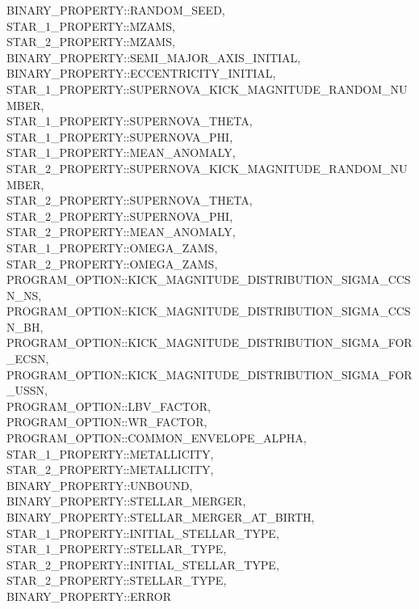 \hfill
\begin{minipage}{\dimexpr\textwidth-2em}
    BINARY\_PROPERTY::RANDOM\_SEED, \\
    STAR\_1\_PROPERTY::MZAMS, \\
    STAR\_2\_PROPERTY::MZAMS, \\
    BINARY\_PROPERTY::SEMI\_MAJOR\_AXIS\_INITIAL, \\
    BINARY\_PROPERTY::ECCENTRICITY\_INITIAL, \\
    STAR\_1\_PROPERTY::SUPERNOVA\_KICK\_MAGNITUDE\_RANDOM\_NUMBER, \\
    STAR\_1\_PROPERTY::SUPERNOVA\_THETA, \\
    STAR\_1\_PROPERTY::SUPERNOVA\_PHI, \\
    STAR\_1\_PROPERTY::MEAN\_ANOMALY, \\
    STAR\_2\_PROPERTY::SUPERNOVA\_KICK\_MAGNITUDE\_RANDOM\_NUMBER, \\
    STAR\_2\_PROPERTY::SUPERNOVA\_THETA, \\
    STAR\_2\_PROPERTY::SUPERNOVA\_PHI, \\
    STAR\_2\_PROPERTY::MEAN\_ANOMALY, \\
    STAR\_1\_PROPERTY::OMEGA\_ZAMS, \\
    STAR\_2\_PROPERTY::OMEGA\_ZAMS, \\
    PROGRAM\_OPTION::KICK\_MAGNITUDE\_DISTRIBUTION\_SIGMA\_CCSN\_NS, \\
    PROGRAM\_OPTION::KICK\_MAGNITUDE\_DISTRIBUTION\_SIGMA\_CCSN\_BH, \\
    PROGRAM\_OPTION::KICK\_MAGNITUDE\_DISTRIBUTION\_SIGMA\_FOR\_ECSN, \\
    PROGRAM\_OPTION::KICK\_MAGNITUDE\_DISTRIBUTION\_SIGMA\_FOR\_USSN, \\
    PROGRAM\_OPTION::LBV\_FACTOR, \\
    PROGRAM\_OPTION::WR\_FACTOR, \\
    PROGRAM\_OPTION::COMMON\_ENVELOPE\_ALPHA, \\
    STAR\_1\_PROPERTY::METALLICITY, \\
    STAR\_2\_PROPERTY::METALLICITY, \\
    BINARY\_PROPERTY::UNBOUND, \\
    BINARY\_PROPERTY::STELLAR\_MERGER, \\
    BINARY\_PROPERTY::STELLAR\_MERGER\_AT\_BIRTH, \\
    STAR\_1\_PROPERTY::INITIAL\_STELLAR\_TYPE, \\
    STAR\_1\_PROPERTY::STELLAR\_TYPE, \\
    STAR\_2\_PROPERTY::INITIAL\_STELLAR\_TYPE, \\
    STAR\_2\_PROPERTY::STELLAR\_TYPE, \\
    BINARY\_PROPERTY::ERROR
\end{minipage}
\par\rcb{;}

